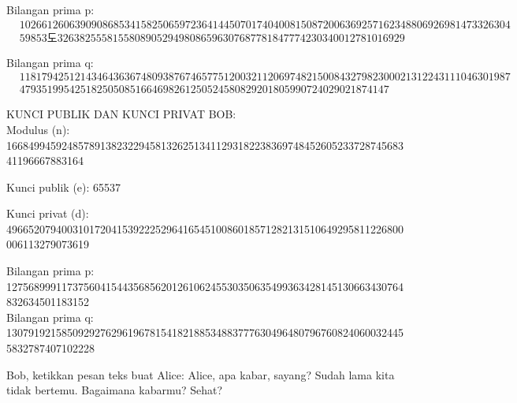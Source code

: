 \documentclass{article}
\begin{document}
Bilangan prima p:
\[
\begin{aligned}
&10266126063909086853415825065972364144507017404008150872006369257162348806926981473326304 \\
&59853도326382555815580890529498086596307687781847774230340012781016929
\end{aligned}
\]

Bilangan prima q:
\[
\begin{aligned}
&11817942512143464363674809387674657751200321120697482150084327982300021312243111046301987 \\
&4793519954251825050851664698261250524580829201805990724029021874147
\end{aligned}
\]

\newpage


KUNCI PUBLIK DAN KUNCI PRIVAT BOB:\\
Modulus (n):\\
16684994592485789138232294581326251341129318223836974845260523372874568341196667883164

Kunci publik (e): 65537

Kunci privat (d):\\
496652079400310172041539222529641654510086018571282131510649295811226800006113279073619

Bilangan prima p:\\
127568999117375604154435685620126106245530350635499363428145130663430764832634501183152\\
Bilangan prima q:\\
1307919215850929276296196781541821885348837776304964807967608240600324455832787407102228

\newpage


Bob, ketikkan pesan teks buat Alice: Alice, apa kabar, sayang? Sudah lama kita tidak bertemu. Bagaimana kabarmu?
Sehat?
\end{document}
